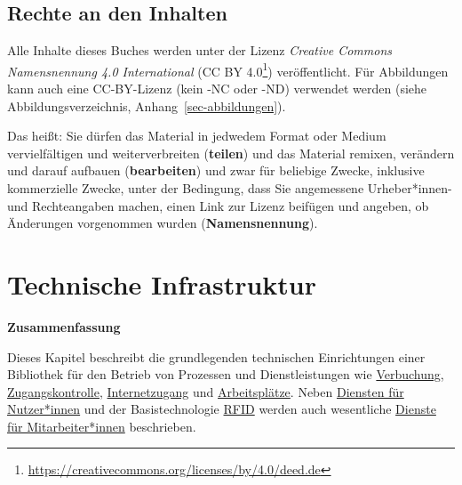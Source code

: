 \documentclass[
  11pt,
  letterpaper,
  DIV=11,
  twoside]{scrreprt}
\DeclareRobustCommand{\href}[2]{#2\footnote{\url{#1}}}
\begin{document}
\section{Rechte an den Inhalten}\label{lizenz}

Alle Inhalte dieses Buches werden unter der Lizenz \emph{Creative
Commons Namensnennung 4.0 International}
(\href{https://creativecommons.org/licenses/by/4.0/deed.de}{CC BY 4.0})
veröffentlicht. Für Abbildungen kann auch eine CC-BY-Lizenz (kein -NC
oder -ND) verwendet werden (siehe Abbildungsverzeichnis,
Anhang~\ref{sec-abbildungen}).

Das heißt: Sie dürfen das Material in jedwedem Format oder Medium
vervielfältigen und weiterverbreiten (\textbf{teilen}) und das Material
remixen, verändern und darauf aufbauen (\textbf{bearbeiten}) und zwar
für beliebige Zwecke, inklusive kommerzielle Zwecke, unter der
Bedingung, dass Sie angemessene Urheber*innen- und Rechteangaben machen,
einen Link zur Lizenz beifügen und angeben, ob Änderungen vorgenommen
wurden (\textbf{Namensnennung}).


\chapter{Technische Infrastruktur}\label{sec-infrastruktur}

\begin{tcolorbox}[enhanced jigsaw, leftrule=.75mm, toprule=.15mm, left=2mm, opacityback=0, arc=.35mm, colback=white, breakable, colframe=quarto-callout-note-color-frame, rightrule=.15mm, bottomrule=.15mm]
\begin{minipage}[t]{5.5mm}
\textcolor{quarto-callout-note-color}{\faInfo}
\end{minipage}%
\begin{minipage}[t]{\textwidth - 5.5mm}

\vspace{-3mm}\textbf{Zusammenfassung}\vspace{3mm}

Dieses Kapitel beschreibt die grundlegenden technischen Einrichtungen
einer Bibliothek für den Betrieb von Prozessen und Dienstleistungen wie
\hyperref[verbuchung]{Verbuchung},
\hyperref[zugangskontrolle]{Zugangskontrolle},
\hyperref[internetzugang]{Internetzugang} und
\hyperref[gruppen--und-einzelarbeitspluxe4tze]{Arbeitsplätze}. Neben
\hyperref[dienste-fuxfcr-nutzerinnen]{Diensten für Nutzer*innen} und der
Basistechnologie \hyperref[rfdi]{RFID} werden auch wesentliche
\hyperref[dienste-fuxfcr-mitarbeiterinnen]{Dienste für
Mitarbeiter*innen} beschrieben.

\end{minipage}%
\end{tcolorbox}
\end{document}
